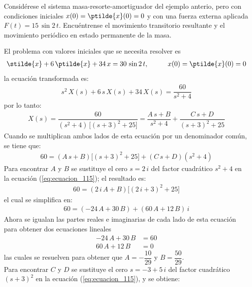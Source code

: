 \begin{ejemplo}
Considérese el sistema masa-resorte-amortiguador del ejemplo anterio, pero con condiciones iniciales $x(0) = \ptilde{x}(0) = 0$ y con una fuerza externa aplicada $F(t) = 15 \, \sin 2 \, t$. Encuéntrense el movimiento transitorio resultante y el movimiento periódico en estado permanente de la masa.
\par
El problema con valores iniciales que se necesita resolver es
\begin{align*}
\stilde{x} + 6 \, \ptilde{x} + 34 \, x = 30 \, \sin 2 \, t, \hspace{1cm} x(0) = \ptilde{x}(0) = 0
\end{align*}
la ecuación transformada es:
\begin{align*}
s^{2} \, X(s) + 6 \, s \, X(s) + 34 \, X(s) = \dfrac{60}{s^{2} + 4}
\end{align*}
por lo tanto:
\begin{align*}
X(s) = \dfrac{60}{(s^{2} {+} 4) \, \big[(s {+} 3)^{2} {+} 25 \big]} = \dfrac{A \, s {+} B}{s^{2} {+} 4} + \dfrac{C \, s {+} D}{(s {+} 3)^{2} {+} 25}
\end{align*}
Cuando se multiplican ambos lados de esta ecuación por un denominador común, se tiene que:
\begin{align}
60 = (A \, s + B) \big[(s + 3)^{2} + 25\big] + (C \, s + D)(s^{2} + 4)
\label{eq:ecuacion_115}
\end{align}
Para encontrar $A$ y $B$ se sustituye el cero $s = 2 \, i$ del factor cuadrático $s^{2} + 4$ en la ecuación (\ref{eq:ecuacion_115}); el resultado es:
\begin{align*}
60 = (2 \, i \, A + B) \big[(2 \, i + 3)^{2} + 25 \big]
\end{align*}
el cual se simplifica en:
\begin{align*}
60 = (-24 \, A + 30 \, B) + (60 \, A + 12 \, B) \, i
\end{align*}
Ahora se igualan las partes reales e imaginarias de cada lado de esta ecuación para obtener dos ecuaciones lineales
\begin{align*}
-24 \, A + 30 \, B &= 60 \\[0.5em]
60 \, A + 12 \, B &= 0
\end{align*}
las cuales se resuelven para obtener que $A =- \dfrac{10}{29}$ y $B = \dfrac{50}{29}$.
\\[0.5em]
Para encontrar $C$ y $D$ se sustituye el cero $s = -3 + 5\, i$ del factor cuadrático $(s + 3)^{2}$ en la ecuación (\ref{eq:ecuacion_115}), y se obtiene:
\begin{align*}

\end{align*}
\end{ejemplo}
